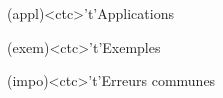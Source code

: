 \documentclass[../../main/main.tex]{subfiles}
\begin{document}
\begin{tcn}[%
		sidebyside, fontupper=\small, fontlower=\small
	]
	\begin{tcn}[nsp](appl)<ctc>'t'{Applications}
	\end{tcn}
	\begin{tcn}[nsp](exem)<ctc>'t'{Exemples}
	\end{tcn}
	\begin{tcn}[nsp](impo)<ctc>'t'{Erreurs communes}
	\end{tcn}
\end{tcn}
\end{document}
